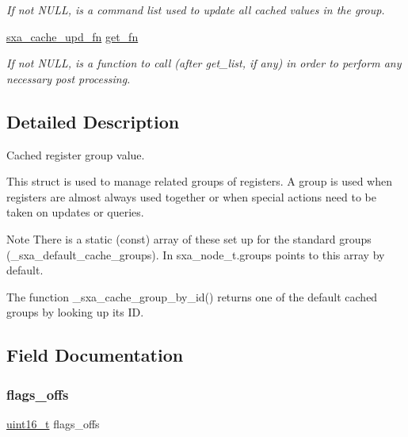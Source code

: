 \begin{DoxyCompactItemize}
\begin{DoxyCompactList}\small\item\em If not N\+U\+LL, is a command list used to update all cached values in the group. \end{DoxyCompactList}\item 
\hyperlink{group___s_x_a_gaaeb2977fc8c351b3edcf007c1effc374}{sxa\+\_\+cache\+\_\+upd\+\_\+fn} \hyperlink{structsxa__cached__group__t_aa73aae7aa31e051678e55ca4025a2d3a}{get\+\_\+fn}
\begin{DoxyCompactList}\small\item\em If not N\+U\+LL, is a function to call (after get\+\_\+list, if any) in order to perform any necessary post processing. \end{DoxyCompactList}\end{DoxyCompactItemize}


\subsection{Detailed Description}
Cached register group value. 

This struct is used to manage related groups of registers. A group is used when registers are almost always used together or when special actions need to be taken on updates or queries.

\begin{DoxyNote}{Note}
There is a static (const) array of these set up for the standard groups (\+\_\+sxa\+\_\+default\+\_\+cache\+\_\+groups). In sxa\+\_\+node\+\_\+t.\+groups points to this array by default.
\end{DoxyNote}
The function \+\_\+sxa\+\_\+cache\+\_\+group\+\_\+by\+\_\+id() returns one of the default cached groups by looking up its ID. 

\subsection{Field Documentation}
\mbox{\label{structsxa__cached__group__t_a384f3d44ddc76275447a4027f7d7dc11}} 
\subsubsection{\texorpdfstring{flags\+\_\+offs}{flags\_offs}}
{\footnotesize\ttfamily \hyperlink{group__hal__dos_ga5a8b2dc9e45a9ee81a94ef304fb62505}{uint16\+\_\+t} flags\+\_\+offs}



